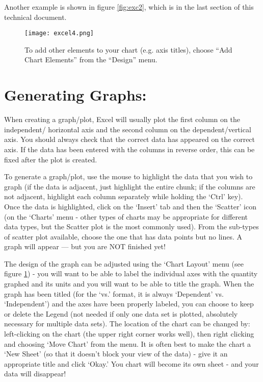 Another example is shown in figure \ref{fig:exc2}, which is in the last section of this technical document.

\begin{figure}[h]
\texttt{[image: excel4.png]}
\centering
\caption{To add other elements to your chart (e.g. axis titles), choose ``Add Chart Elements'' from the ``Design'' menu.}
\label{fig:exc4}
\end{figure}

\section*{Generating Graphs:}
When creating a graph/plot, Excel will usually plot the first column on the independent/ horizontal axis and the second column on the dependent/vertical axis. 
You should always check that the correct data has appeared on the correct axis. 
If the data has been entered with the columns in reverse order, this can be fixed after the plot is created.
\par
To generate a graph/plot, use the mouse to highlight the data that you wish to graph (if the data is adjacent, just highlight the entire chunk; if the columns are not adjacent, highlight each column separately while holding the `Ctrl' key). 
Once the data is highlighted, click on the `Insert' tab and then the `Scatter' icon (on the `Charts' menu - other types of charts may be appropriate for different data types, but the Scatter plot is the most commonly used). 
From the sub-types of scatter plot available, choose the one that has data points but no lines. 
A graph will appear — but you are NOT finished yet!
\par
The design of the graph can be adjusted using the `Chart Layout' menu (see figure \ref{fig:exc4}) - you will want to be able to label the individual axes with the quantity graphed and its units and you will want to be able to title the graph. 
When the graph has been titled (for the `vs.' format, it is always `Dependent' vs. `Independent') and the axes have been properly labeled, you can choose to keep or delete the Legend (not needed if only one data set is plotted, absolutely necessary for multiple data sets). 
The location of the chart can be changed by: left-clicking on the chart (the upper right corner works well), then right clicking and choosing `Move Chart' from the menu. 
It is often best to make the chart a `New Sheet' (so that it doesn't block your view of the data) - give it an appropriate title and click `Okay.' 
You chart will become its own sheet - and your data will disappear! 
